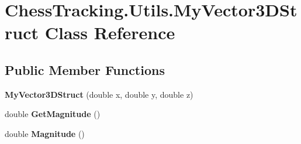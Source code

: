 \hypertarget{class_chess_tracking_1_1_utils_1_1_my_vector3_d_struct}{}\section{Chess\+Tracking.\+Utils.\+My\+Vector3\+D\+Struct Class Reference}
\label{class_chess_tracking_1_1_utils_1_1_my_vector3_d_struct}
\subsection*{Public Member Functions}
\begin{DoxyCompactItemize}
\item 
\mbox{\label{class_chess_tracking_1_1_utils_1_1_my_vector3_d_struct_a2a60bcd4d2b1efbfbbc7c94cf57e5e17}} 
{\bfseries My\+Vector3\+D\+Struct} (double x, double y, double z)
\item 
\mbox{\label{class_chess_tracking_1_1_utils_1_1_my_vector3_d_struct_a083f8d5737df557413a058da1b2d829b}} 
double {\bfseries Get\+Magnitude} ()
\item 
\mbox{\label{class_chess_tracking_1_1_utils_1_1_my_vector3_d_struct_a765e663249b2c1a75b51c8c22c307d15}} 
double {\bfseries Magnitude} ()
\end{DoxyCompactItemize}
